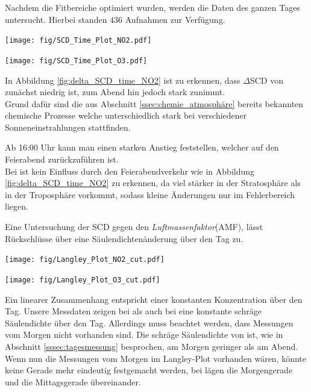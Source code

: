 \documentclass[12pt, a4paper, bibliography=totoc]{scrartcl}
\begin{document}
\begin{multicols}{2}
Nachdem die Fitbereiche optimiert wurden, werden die Daten des ganzen Tages untersucht. 
Hierbei standen $436$ Aufnahmen zur Verfügung.


\begin{center}
	\texttt{[image: fig/SCD\_Time\_Plot\_NO2.pdf]}
	\label{fig:delta_SCD_time_NO2}
\end{center}
       
\begin{center}
	\texttt{[image: fig/SCD\_Time\_Plot\_O3.pdf]}
	\label{fig:delta_SCD_time_O3}
\end{center}       

In Abbildung \ref{fig:delta_SCD_time_NO2} ist zu erkennen, dass $\Delta$SCD von  zunächst niedrig ist, zum Abend hin jedoch stark zunimmt.\\
Grund dafür sind die aus Abschnitt \ref{ssec:chemie_atmosphäre} bereits bekannten chemische Prozesse welche unterschiedlich stark bei verschiedener Sonneneinstrahlungen stattfinden.

Ab 16:00 Uhr kann man einen starken Anstieg feststellen, welcher auf den Feierabend zurückzuführen ist.\\

Bei  ist kein Einfluss durch den Feierabendverkehr wie in Abbildung \ref{fig:delta_SCD_time_NO2} zu erkennen, da  viel stärker in der Stratosphäre als in der Troposphäre vorkommt, sodass kleine  Änderungen nur im Fehlerbereich liegen.


Eine Untersuchung der SCD gegen den \textit{Luftmassenfaktor}(AMF), lässt Rückschlüsse über eine Säulendichtenänderung über den Tag zu.

\begin{center}
	\texttt{[image: fig/Langley\_Plot\_NO2\_cut.pdf]}
	\label{fig:langley_NO2}
\end{center}

\begin{center}
	\texttt{[image: fig/Langley\_Plot\_O3\_cut.pdf]}
	\label{fig:langley_O3}
\end{center}

Ein linearer Zusammenhang entspricht einer konstanten Konzentration über den Tag. 
Unsere Messdaten zeigen bei  als auch bei  eine konstante schräge Säulendichte über den Tag.
Allerdings muss beachtet werden, dass Messungen vom Morgen nicht vorhanden sind.
Die schräge Säulendichte von  ist, wie in Abschnitt \ref{sssec:tagesmessung} besprochen, am Morgen geringer als am Abend.
Wenn nun die Messungen vom Morgen im Langley-Plot vorhanden wären, könnte keine Gerade mehr eindeutig festgemacht werden, bei  lägen die Morgengerade und die Mittagsgerade übereinander.


\end{multicols}
\end{document}
